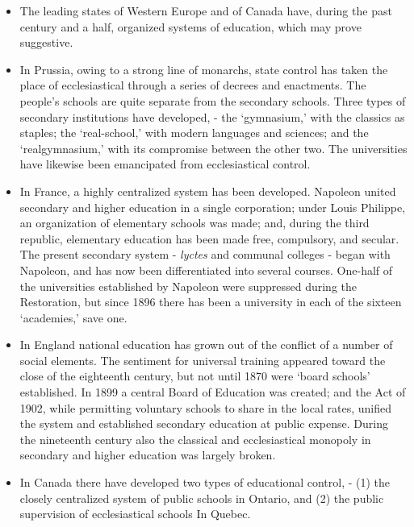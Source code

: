 \documentclass[]{book}
\providecommand{\tightlist}{%
  \setlength{\itemsep}{0pt}\setlength{\parskip}{0pt}}
\begin{document}
\begin{itemize}
\tightlist
\item
  The leading states of Western Europe and of Canada have, during the past century and a half, organized systems of education, which may prove suggestive.
\item
  In Prussia, owing to a strong line of monarchs, state control has taken the place of ecclesiastical through a series of decrees and enactments. The people's schools are quite separate from the secondary schools. Three types of secondary institutions have developed, - the `gymnasium,' with the classics as staples; the `real-school,' with modern languages and sciences; and the `realgymnasium,' with its compromise between the other two. The universities have likewise been emancipated from ecclesiastical control.
\item
  In France, a highly centralized system has been developed. Napoleon united secondary and higher education in a single corporation; under Louis Philippe, an organization of elementary schools was made; and, during the third republic, elementary education has been made free, compulsory, and secular. The present secondary system - \emph{lyctes} and communal colleges - began with Napoleon, and has now been differentiated into several courses. One-half of the universities established by Napoleon were suppressed during the Restoration, but since 1896 there has been a university in each of the sixteen `academies,' save one.
\item
  In England national education has grown out of the conflict of a number of social elements. The sentiment for universal training appeared toward the close of the eighteenth century, but not until 1870 were `board schools' established. In 1899 a central Board of Education was created; and the Act of 1902, while permitting voluntary schools to share in the local rates, unified the system and established secondary education at public expense. During the nineteenth century also the classical and ecclesiastical monopoly in secondary and higher education was largely broken.
\item
  In Canada there have developed two types of educational control, - (1) the closely centralized system of public schools in Ontario, and (2) the public supervision of ecclesiastical schools In Quebec.
\end{itemize}
\end{document}

